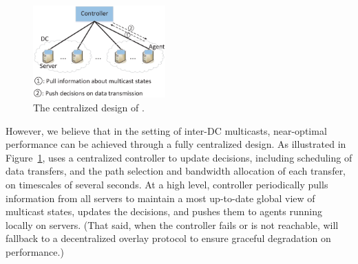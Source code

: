 \begin{figure}[t]
  \centering
  \includegraphics[width=2in]{images/framework.eps}
  \caption{The centralized design of \name.}
  \label{fig:framework}
\vspace{-0.4cm}
\end{figure}

However, we believe that in the setting of inter-DC
multicasts, near-optimal performance can be achieved
through a fully centralized design.
As illustrated in Figure~\ref{fig:framework},
\name uses a centralized controller to update decisions,
including scheduling of data transfers, and the path selection and
bandwidth allocation of each transfer, on timescales of
several seconds.
At a high level, \name controller periodically pulls information
from all servers to maintain a most up-to-date global view of
multicast states, updates the decisions, and pushes them
to agents running locally on servers.
(That said, when the controller fails or is
not reachable, \name will fallback to a decentralized
overlay protocol to ensure graceful degradation on performance.)

